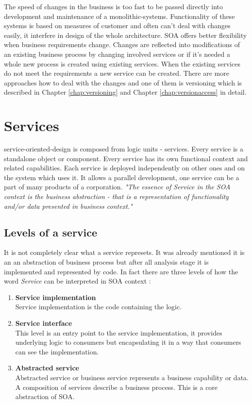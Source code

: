 The speed of changes in the business is too fast to be passed directly into development and maintenance of a \gls{monolithic-systems}. Functionality of these systems is based on measures of customer and often can't deal with changes easily, it interfere in design of the whole architecture. SOA offers better flexibility when business requirements change. Changes are reflected into modifications of an existing business process by changing involved services or if it's needed a whole new process is created using existing services. When the existing services do not meet the requirements a new service can be created. There are more approaches how to deal with the changes and one of them is versioning which is described in Chapter \ref{chap:versioning} and Chapter \ref{chap:versionaccess} in detail.

\section{Services}
\label{sec:services}
\gls{service-oriented-design} is composed from logic units - services. Every service is a standalone object or component. Every service has its own functional context and related capabilities. Each service is deployed independently on other ones and on the system which uses it. It allows a parallel development, one service can be a part of many products of a corporation.
\textit{"The essence of Service in the SOA context is the business abstraction - that is a representation of functionality and/or data presented in business context."} \cite{agile-architecture}

\subsection{Levels of a service} 
\label{subsec:levels-of-service}

It is not completely clear what a service represets. It was already mentioned it is an an abstraction of business process but after all analysis stage it is implemented and represented by code.
In fact there are three levels of how the word \emph{Service} can be interpreted in SOA context \cite{agile-architecture}:
\begin{enumerate}
  \item \textbf{Service implementation} \hfill \\
Service implementation is the code containing the logic.
  \item \textbf{Service interface} \hfill \\ 
This level is an entry point to the service implementation, it provides underlying logic to consumers but encapsulating it in a way that consumers can see the implementation. 
  \item \textbf{Abstracted service} \hfill \\
Abstracted service or business service represents a business capability or data. A composition of services describe a business process. This is a core abstraction of SOA.
\end{enumerate}

